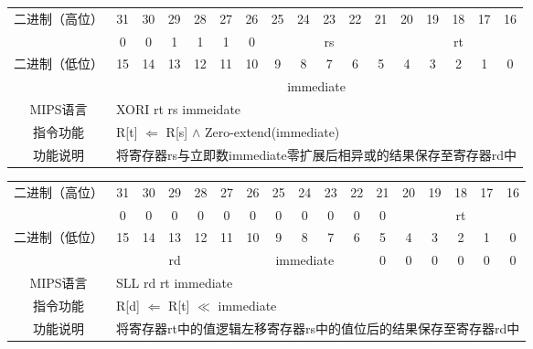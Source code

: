 \begin{table}
\begin{tabular}{|c|c|c|c|c|c|c|c|c|c|c|c|c|c|c|c|c|}
\hline
\multirow{2}{*}{二进制（高位）} &
31&30&29&28&27&26&25&24&23&22&21&20&19&18&17&16\\
\cline{2-17}
&
0&0&1&1&1&
0&
\multicolumn{5}{c|}{rs}&
\multicolumn{5}{c|}{rt}\\
\hline
\multirow{2}{*}{二进制（低位）} &
15&14&13&12&11&10&9&8&7&6&5&4&3&2&1&0\\
\cline{2-17}
&
\multicolumn{16}{c|}{immediate}\\
\hline
MIPS语言&
\multicolumn{16}{l|}{XORI rt rs immeidate}\\
\hline
指令功能&
\multicolumn{16}{l|}{R[t] $\Leftarrow$ R[s] $\land$ Zero-extend(immediate)}\\
\hline
功能说明&
\multicolumn{16}{l|}{将寄存器rs与立即数immediate零扩展后相异或的结果保存至寄存器rd中}\\
\hline
\end{tabular}
\end{table}

\begin{table}
\begin{tabular}{|c|c|c|c|c|c|c|c|c|c|c|c|c|c|c|c|c|}
\hline
\multirow{2}{*}{二进制（高位）} &
31&30&29&28&27&26&25&24&23&22&21&20&19&18&17&16\\
\cline{2-17}
&
0&0&0&0&0&
0&0&0&0&0&
0&
\multicolumn{5}{c|}{rt}\\
\hline
\multirow{2}{*}{二进制（低位）} &
15&14&13&12&11&10&9&8&7&6&5&4&3&2&1&0\\
\cline{2-17}
&
\multicolumn{5}{c|}{rd} &
\multicolumn{5}{c|}{immediate} &
0&0&0&0&0&
0\\
\hline
MIPS语言&
\multicolumn{16}{l|}{SLL rd rt immediate}\\
\hline
指令功能&
\multicolumn{16}{l|}{R[d] $\Leftarrow$ R[t] $\ll$ immediate}\\
\hline
功能说明&
\multicolumn{16}{l|}{将寄存器rt中的值逻辑左移寄存器rs中的值位后的结果保存至寄存器rd中}\\
\hline
\end{tabular}
\end{table}

